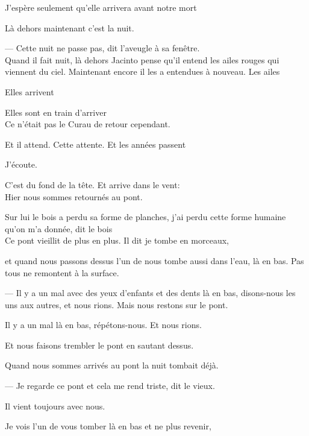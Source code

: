 J'espère seulement qu'elle arrivera avant notre mort

\breakk

\vspace*{4cm}

Là dehors maintenant c'est la nuit.

--- Cette nuit ne passe pas, dit l'aveugle à sa fenêtre.\\

Quand il fait nuit, là dehors Jacinto pense qu'il entend les ailes
rouges qui viennent du ciel. Maintenant encore il les a entendues à
nouveau. Les ailes

Elles arrivent

Elles sont en train d'arriver\\

Ce n'était pas le Curau de retour cependant.

Et il attend. Cette attente. Et les années passent

\clearpage
\thispagestyle{empty}
\movetoevenpage

\vspace*{4cm}

J'écoute.

C'est du fond de la tête. Et arrive dans le vent:\\

Hier nous sommes retournés au pont.

Sur lui le bois a perdu sa forme de planches, j'ai perdu cette forme
humaine qu'on m'a donnée, dit le bois\\

Ce pont vieillit de plus en plus. Il dit je tombe en morceaux,

et quand nous passons dessus l'un de nous tombe aussi dans l'eau, là en
bas. Pas tous ne remontent à la surface.

--- Il y a un mal avec des yeux d'enfants et des dents là en bas,
disons-nous les uns aux autres, et nous rions. Mais nous restons sur le
pont.

Il y a un mal là en bas, répétons-nous. Et nous rions.

Et nous faisons trembler le pont en sautant dessus.

Quand nous sommes arrivés au pont la nuit tombait déjà.

--- Je regarde ce pont et cela me rend triste, dit le vieux.

Il vient toujours avec nous.

Je vois l'un de vous tomber là en bas et ne plus revenir,

